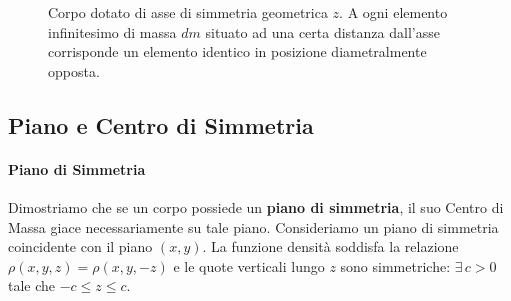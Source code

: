\begin{figure}[ht]
    \centering
    \caption{Corpo dotato di asse di simmetria geometrica $z$. A ogni elemento infinitesimo di massa $dm$ situato ad una certa distanza dall'asse corrisponde un elemento identico in posizione diametralmente opposta.}
\end{figure}

\subsection{Piano e Centro di Simmetria}

\paragraph{Piano di Simmetria}
Dimostriamo che se un corpo possiede un \textbf{piano di simmetria}, il suo Centro di Massa giace necessariamente su tale piano.
Consideriamo un piano di simmetria coincidente con il piano $(x,y)$. La funzione densità soddisfa la relazione $\rho(x,y,z) = \rho(x,y,-z)$ e le quote verticali lungo $z$ sono simmetriche: $\exists \, c > 0$ tale che $-c \le z \le c$.

